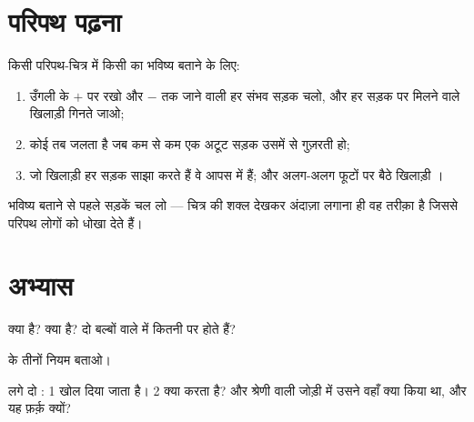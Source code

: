 \section{परिपथ पढ़ना}

\begin{method}[सड़कों का पीछा करना]\label{met:g5:series-parallel-circuits:follow}
किसी परिपथ-चित्र में किसी  का भविष्य बताने के लिए:
\begin{enumerate}
  \item उँगली  के $+$ पर रखो और $-$ तक जाने वाली हर संभव सड़क
        चलो, और हर सड़क पर मिलने वाले खिलाड़ी गिनते जाओ;
  \item कोई  तब जलता है जब कम से कम एक अटूट सड़क उसमें से गुज़रती
        हो;
  \item जो खिलाड़ी हर सड़क साझा करते हैं वे आपस में  हैं;
        और अलग-अलग फूटों पर बैठे खिलाड़ी ।
\end{enumerate}
भविष्य बताने से पहले सड़कें चल लो --- चित्र की शक्ल देखकर अंदाज़ा
लगाना ही वह तरीक़ा है जिससे परिपथ लोगों को धोखा देते हैं।
\end{method}

\section{अभ्यास}

\begin{exercise}[$\star$]\label{exo:g5:series-parallel-circuits:1}
 क्या है?  क्या है? दो बल्बों वाले  में कितनी
 पर  होते हैं?
\end{exercise}

\begin{exercise}[$\star$]\label{exo:g5:series-parallel-circuits:2}
 के तीनों नियम बताओ।
\end{exercise}

\begin{exercise}[$\star$]\label{exo:g5:series-parallel-circuits:3}
 लगे दो :  1 खोल दिया जाता है।  2 क्या करता
है? और श्रेणी वाली जोड़ी में उसने वहाँ क्या किया था, और यह फ़र्क़
क्यों?
\end{exercise}

